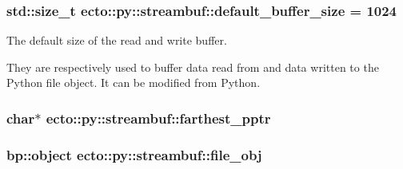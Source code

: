 \subsubsection[{\texorpdfstring{default\+\_\+buffer\+\_\+size}{default_buffer_size}}]{\setlength{\rightskip}{0pt plus 5cm}std\+::size\+\_\+t ecto\+::py\+::streambuf\+::default\+\_\+buffer\+\_\+size = 1024\hspace{0.3cm}{\ttfamily [static]}}\hypertarget{classecto_1_1py_1_1streambuf_a7a20a01fb9aeda8677b3c65bccd6b59d}{}\label{classecto_1_1py_1_1streambuf_a7a20a01fb9aeda8677b3c65bccd6b59d}


The default size of the read and write buffer. 

They are respectively used to buffer data read from and data written to the Python file object. It can be modified from Python. 
\subsubsection[{\texorpdfstring{farthest\+\_\+pptr}{farthest_pptr}}]{\setlength{\rightskip}{0pt plus 5cm}char$\ast$ ecto\+::py\+::streambuf\+::farthest\+\_\+pptr\hspace{0.3cm}{\ttfamily [private]}}\hypertarget{classecto_1_1py_1_1streambuf_a8267e360cfb0201b1518a0dfd3d7c353}{}\label{classecto_1_1py_1_1streambuf_a8267e360cfb0201b1518a0dfd3d7c353}
\subsubsection[{\texorpdfstring{file\+\_\+obj}{file_obj}}]{\setlength{\rightskip}{0pt plus 5cm}bp\+::object ecto\+::py\+::streambuf\+::file\+\_\+obj}\hypertarget{classecto_1_1py_1_1streambuf_a63254ed85f60504895f526272e19dd34}{}\label{classecto_1_1py_1_1streambuf_a63254ed85f60504895f526272e19dd34}

